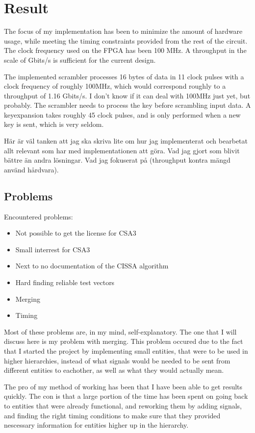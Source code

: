 \chapter{Result}
The focus of my implementation has been to minimize the amount of hardware usage,
while meeting the timing constraints provided from the rest of the circuit. The 
clock frequency used on the FPGA has been 100 MHz. A throughput in the scale of 
Gbits/s is sufficient for the current design.

The implemented scrambler processes 16 bytes of data in 11 clock pulses with a 
clock frequency of roughly 100MHz, which would correspond roughly to a throughput
of 1.16 Gbits/s. I don't know if it can deal with 100MHz just yet, but probably. 
The scrambler needs to process the key before scrambling input data. A 
keyexpansion takes roughly 45 clock pulses, and is only performed when a new key 
is sent, which is very seldom.

Här är väl tanken att jag ska skriva lite om hur jag implementerat
och bearbetat allt relevant som har med implementationen att göra. 
Vad jag gjort som blivit bättre än andra lösningar. Vad jag fokuserat
på (throughput kontra mängd använd hårdvara).

\section{Problems}
Encountered problems:

\begin{itemize}
\item Not possible to get the license for CSA3
\item Small interrest for CSA3
\item Next to no documentation of the CISSA algorithm
\item Hard finding reliable test vectors
\item Merging
\item Timing
\end{itemize}

Most of these problems are, in my mind, self-explanatory. The one that I will 
discuss here is my problem with merging. This problem occured due to the fact 
that I started the project by implementing small entities, that were to be used 
in higher hierarchies, instead of what signals would be needed to be sent from 
different entities to eachother, as well as what they would actually mean.

The pro of my method of working has been that I have been able to get results 
quickly. The con is that a large portion of the time has been spent on going back
to entities that were already functional, and reworking them by adding signals, 
and finding the right timing conditions to make sure that they provided 
nescessary information for entities higher up in the hierarchy.

